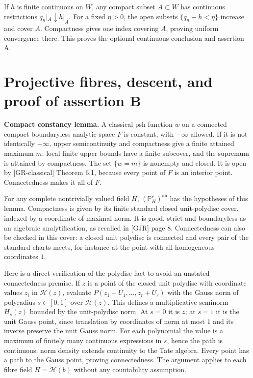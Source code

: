 \documentclass[
  11pt,
]{article}
\begin{document}
If \(h\) is finite continuous on \(W\), any compact subset
\(A\subset W\) has continuous restrictions \(q_n|_A\downarrow h|_A\).
For a fixed \(\eta>0\), the open subsets \(\{q_n-h<\eta\}\) increase and
cover \(A\). Compactness gives one index covering \(A\), proving uniform
convergence there. This proves the optional continuous conclusion and
assertion A.

\section{Projective fibres, descent, and proof of assertion
B}\label{projective-fibres-descent-and-proof-of-assertion-b}

\textbf{Compact constancy lemma.} A classical psh function \(w\) on a
connected compact boundaryless analytic space \(F\) is constant, with
\(-\infty\) allowed. If it is not identically \(-\infty\), upper
semicontinuity and compactness give a finite attained maximum \(m\):
local finite upper bounds have a finite subcover, and the supremum is
attained by compactness. The set \(\{w=m\}\) is nonempty and closed. It
is open by {[}GR-classical{]} Theorem 6.1, because every point of \(F\)
is an interior point. Connectedness makes it all of \(F\).

For any complete nontrivially valued field \(H\),
\((\mathbb P_H^r)^{\mathrm{an}}\) has the hypotheses of this lemma.
Compactness is given by its finite standard closed unit-polydisc cover,
indexed by a coordinate of maximal norm. It is good, strict and
boundaryless as an algebraic analytification, as recalled in {[}GJR{]}
page 8. Connectedness can also be checked in this cover: a closed unit
polydisc is connected and every pair of the standard charts meets, for
instance at the point with all homogeneous coordinates \(1\).

Here is a direct verification of the polydisc fact to avoid an unstated
connectedness premise. If \(z\) is a point of the closed unit polydisc
with coordinate values \(z_i\) in \(\mathcal H(z)\), evaluate
\(P(z_1+U_1,\ldots,z_r+U_r)\) with the Gauss norm of polyradius
\(s\in[0,1]\) over \(\mathcal H(z)\). This defines a multiplicative
seminorm \(H_s(z)\) bounded by the unit-polydisc norm. At \(s=0\) it is
\(z\); at \(s=1\) it is the unit Gauss point, since translation by
coordinates of norm at most \(1\) and its inverse preserve the unit
Gauss norm. For each polynomial the value is a maximum of finitely many
continuous expressions in \(s\), hence the path is continuous; norm
density extends continuity to the Tate algebra. Every point has a path
to the Gauss point, proving connectedness. The argument applies to each
fibre field \(H=\mathcal H(b)\) without any countability assumption.
\end{document}

